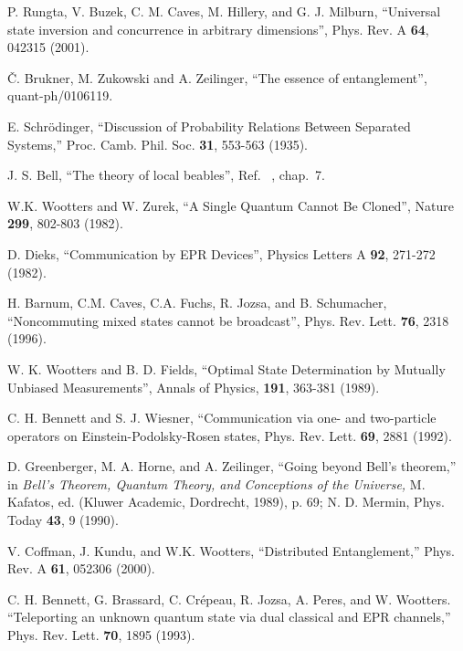 \documentclass[pra,twocolumn,nofootinbib,showpacs]{revtex4}
\begin{document}
\begin{thebibliography}{99}
 P. Rungta, V. Buzek, C. M. Caves, M. Hillery, and
G. J. Milburn, ``Universal state inversion and concurrence in arbitrary
dimensions'', Phys. Rev. A \textbf{64}, 042315 (2001).


 \v{C}. Brukner, M. Zukowski and A. Zeilinger, ``The essence of
entanglement'', quant-ph/0106119.

 E. Schr\"{o}dinger, ``Discussion of Probability
Relations Between Separated Systems,'' Proc. Camb. Phil. Soc. \textbf{31},
553-563 (1935).

 J. S. Bell, ``The theory of local beables'', Ref.~%
\cite{Bellbook}, chap.~7.

 W.K. Wootters and W. Zurek, ``A Single Quantum
Cannot Be Cloned'', Nature \textbf{299}, 802-803 (1982).

 D. Dieks, ``Communication by EPR Devices'', Physics Letters
A \textbf{92}, 271-272 (1982).

 H. Barnum, C.M. Caves, C.A. Fuchs, R. Jozsa, and B.
Schumacher, ``Noncommuting mixed states cannot be broadcast'', Phys. Rev.
Lett. \textbf{76}, 2318 (1996).

 W. K. Wootters and B. D. Fields, ``Optimal State
Determination by Mutually Unbiased Measurements'', Annals of Physics,
\textbf{191}, 363-381 (1989).


 C. H. Bennett and S. J. Wiesner, ``Communication via
one- and two-particle operators on Einstein-Podolsky-Rosen states, Phys.
Rev. Lett. \textbf{69}, 2881 (1992).

 D. Greenberger, M. A. Horne, and A. Zeilinger, ``Going beyond
Bell's theorem,'' in \textit{Bell's Theorem, Quantum Theory, and Conceptions
of the Universe, }M. Kafatos, ed. (Kluwer Academic, Dordrecht, 1989), p. 69;
N. D. Mermin, Phys. Today \textbf{43}, 9 (1990).

 V. Coffman, J. Kundu, and W.K. Wootters,
``Distributed Entanglement,'' Phys. Rev. A \textbf{61}, 052306 (2000).

 C. H. Bennett, G. Brassard, C. Cr\'{e}peau, R.
Jozsa, A. Peres, and W. Wootters. ``Teleporting an unknown quantum
state via dual classical and EPR channels,'' Phys. Rev. Lett.
\textbf{70}, 1895 (1993).


\end{thebibliography}
\end{document}
